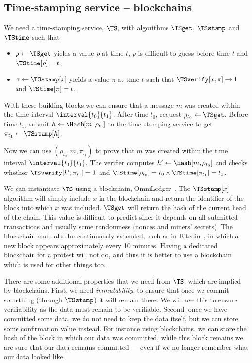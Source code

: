 \subsection{Time-stamping service -- blockchains}%
\label{StorageProperties}


We need a time-stamping service, \(\TS\), with algorithms \(\TSget\), 
\(\TSstamp\) and \(\TStime\) such that
\begin{itemize}
  \item \(\rho \gets \TSget\) yields a value \(\rho\) at time \(t\), \(\rho\) is difficult to guess before time \(t\) and \(\TStime[\rho] = t\);
  \item \(\pi\gets \TSstamp[x]\) yields a value \(\pi\) at time \(t\) such that \(\TSverify[x, \pi]\to 1\) and \(\TStime[\pi] = t\).
\end{itemize}

With these building blocks we can ensure that a message \(m\) was created within the time interval \(\interval{t_0}{t_1}\).
After time \(t_0\), request \(\rho_{t_0}\gets \TSget\).
Before time \(t_1\), submit \(h\gets \Hash[m, \rho_{t_0}]\) to the time-stamping service to get \(\pi_{t_1}\gets \TSstamp[h]\).

Now we can use \((\rho_{t_0}, m, \pi_{t_1})\) to prove that \(m\) was created within the time interval \(\interval{t_0}{t_1}\).
The verifier computes \(h'\gets \Hash[m, \rho_{t_0}]\) and checks whether \(\TSverify[h', \pi_{t_1}] = 1\) and \(\TStime[\rho_{t_0}] = t_0\land \TStime[\pi_{t_1}] = t_1\).

We can instantiate \(\TS\) using a blockchain, \eg OmniLedger~\cite{OmniLedger}.
The \(\TSstamp[x]\) algorithm will simply include \(x\) in the blockchain and 
return the identifier of the block into which \(x\) was included.
\(\TSget\) will return the hash of the current head of the chain.
This value is difficult to predict since it depends on all submitted transactions and usually some randomness (\eg nonces and miners' secrets).
The blockchain must also be continuously extended, such as in Bitcoin~\cite{Bitcoin}, in which a new block appears approximately every 10 minutes.
Having a dedicated blockchain for a protest will not do, and thus it is better 
to use a blockchain which is used for other things too.

There are some additional properties that we need from \(\TS\), which are implied by blockchains.
First, we need \emph{immutability}, to ensure that once we commit something (through \(\TSstamp\)) it will remain there.
We will use this to ensure verifiability as the data must remain to be verifiable.
Second, once we have committed some data, we do not need to keep the data itself, but we can store some confirmation value instead.
For instance using blockchains, we can store the hash of the block in which our 
data was committed, while this block remains we are sure that our data remains 
committed --- even if we no longer remember what our data looked like.
